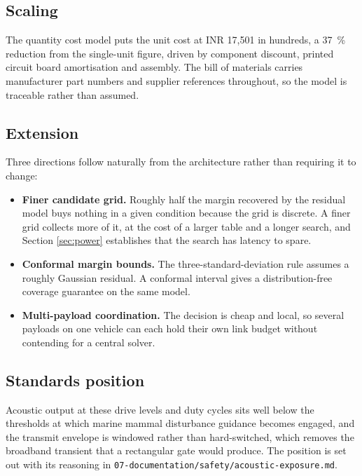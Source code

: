 \documentclass[11pt,a4paper]{article}
\begin{document}
\subsection{Scaling}

The quantity cost model puts the unit cost at INR 17{,}501 in hundreds, a
\SI{37}{\percent} reduction from the single-unit figure, driven by component
discount, printed circuit board amortisation and assembly. The bill of materials
carries manufacturer part numbers and supplier references throughout, so the
model is traceable rather than assumed.

\subsection{Extension}

Three directions follow naturally from the architecture rather than requiring
it to change:

\begin{itemize}
\item \textbf{Finer candidate grid.} Roughly half the margin recovered by the
      residual model buys nothing in a given condition because the grid is
      discrete. A finer grid collects more of it, at the cost of a larger table
      and a longer search, and Section \ref{sec:power} establishes that the
      search has latency to spare.
\item \textbf{Conformal margin bounds.} The three-standard-deviation rule
      assumes a roughly Gaussian residual. A conformal interval gives a
      distribution-free coverage guarantee on the same model.
\item \textbf{Multi-payload coordination.} The decision is cheap and local, so
      several payloads on one vehicle can each hold their own link budget
      without contending for a central solver.
\end{itemize}

\subsection{Standards position}

Acoustic output at these drive levels and duty cycles sits well below the
thresholds at which marine mammal disturbance guidance becomes engaged, and the
transmit envelope is windowed rather than hard-switched, which removes the
broadband transient that a rectangular gate would produce. The position is set
out with its reasoning in \texttt{07-documentation/safety/acoustic-exposure.md}.
\end{document}
